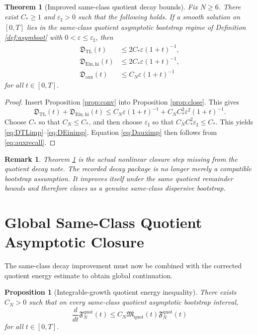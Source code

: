 \documentclass[11pt]{article}
\newtheorem{proposition}{Proposition}
\newtheorem{remark}{Remark}
\newtheorem{theorem}{Theorem}
\begin{document}
\begin{theorem}[Improved same-class quotient decay bounds]
\label{thm:improve}
Fix \(N\ge 6\). There exist \(C_\ast\ge 1\) and \(\varepsilon_\sharp>0\) such that the following holds. If a smooth solution on \([0,T]\) lies in the same-class quotient asymptotic bootstrap regime of Definition \ref{def:asymboot} with \(0<\varepsilon\le \varepsilon_\sharp\), then
\begin{align}
\mathfrak D_{\mathrm{TL}}(t)
&\le
2C_\ast\varepsilon(1+t)^{-1},
\label{eq:DTLimp}
\\
\mathfrak D_{\mathrm{Ein,hi}}(t)
&\le
2C_\ast\varepsilon(1+t)^{-1},
\label{eq:DEinimp}
\\
\mathfrak D_{\mathrm{aux}}(t)
&\le
C_N\varepsilon(1+t)^{-1}
\label{eq:Dauximp}
\end{align}
for all \(t\in[0,T]\).
\end{theorem}

\begin{proof}
Insert Proposition \ref{prop:conv} into Proposition \ref{prop:close}. This gives
\[
\mathfrak D_{\mathrm{TL}}(t)+\mathfrak D_{\mathrm{Ein,hi}}(t)
\le
C_N\varepsilon(1+t)^{-1}
+C_NC_\ast^2\varepsilon^2(1+t)^{-1}.
\]
Choose \(C_\ast\) so that \(C_N\le C_\ast\), and then choose \(\varepsilon_\sharp\) so that \(C_NC_\ast^2\varepsilon_\sharp\le C_\ast\). This yields \eqref{eq:DTLimp}--\eqref{eq:DEinimp}. Equation \eqref{eq:Dauximp} then follows from \eqref{eq:auxrecall}.
\end{proof}

\begin{remark}
Theorem \ref{thm:improve} is the actual nonlinear closure step missing from the quotient decay note. The recorded decay package is no longer merely a compatible bootstrap assumption. It improves itself under the same quotient remainder bounds and therefore closes as a genuine same-class dispersive bootstrap.
\end{remark}

\section{Global Same-Class Quotient Asymptotic Closure}

The same-class decay improvement must now be combined with the corrected quotient energy estimate to obtain global continuation.

\begin{proposition}[Integrable-growth quotient energy inequality]
\label{prop:Fineq}
There exists \(C_N>0\) such that on every same-class quotient asymptotic bootstrap interval,
\begin{equation}
\frac{d}{dt}\mathfrak F_N^{\mathrm{quot}}(t)
\le
C_N\mathfrak M_{\mathrm{quot}}(t)\mathfrak F_N^{\mathrm{quot}}(t)
\label{eq:Fineq}
\end{equation}
for all \(t\in[0,T]\).
\end{proposition}
\end{document}
